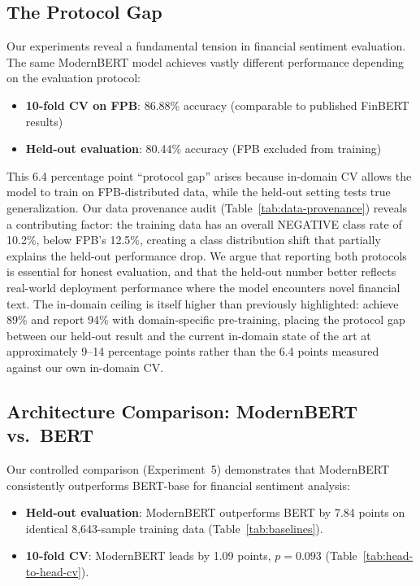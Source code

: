 \documentclass[11pt]{article}
\begin{document}
\subsection{The Protocol Gap}

Our experiments reveal a fundamental tension in financial sentiment evaluation. The same ModernBERT model achieves vastly different performance depending on the evaluation protocol:

\begin{itemize}[nosep]
    \item \textbf{10-fold CV on FPB}: 86.88\% accuracy (comparable to published FinBERT results)
    \item \textbf{Held-out evaluation}: 80.44\% accuracy (FPB excluded from training)
\end{itemize}

This 6.4 percentage point ``protocol gap'' arises because in-domain CV allows the model to train on FPB-distributed data, while the held-out setting tests true generalization. Our data provenance audit (Table~\ref{tab:data-provenance}) reveals a contributing factor: the training data has an overall NEGATIVE class rate of 10.2\%, below FPB's 12.5\%, creating a class distribution shift that partially explains the held-out performance drop. We argue that reporting both protocols is essential for honest evaluation, and that the held-out number better reflects real-world deployment performance where the model encounters novel financial text. The in-domain ceiling is itself higher than previously highlighted: \citet{fatemi2024finbert} achieve 89\% and \citet{liu2020finbert} report 94\% with domain-specific pre-training, placing the protocol gap between our held-out result and the current in-domain state of the art at approximately 9--14 percentage points rather than the 6.4 points measured against our own in-domain CV.

\subsection{Architecture Comparison: ModernBERT vs.\ BERT}

Our controlled comparison (Experiment~5) demonstrates that ModernBERT consistently outperforms BERT-base for financial sentiment analysis:

\begin{itemize}[nosep]
    \item \textbf{Held-out evaluation}: ModernBERT outperforms BERT by 7.84 points on identical 8,643-sample training data (Table~\ref{tab:baselines}).
    \item \textbf{10-fold CV}: ModernBERT leads by 1.09 points, $p = 0.093$ (Table~\ref{tab:head-to-head-cv}).
\end{itemize}
\end{document}
